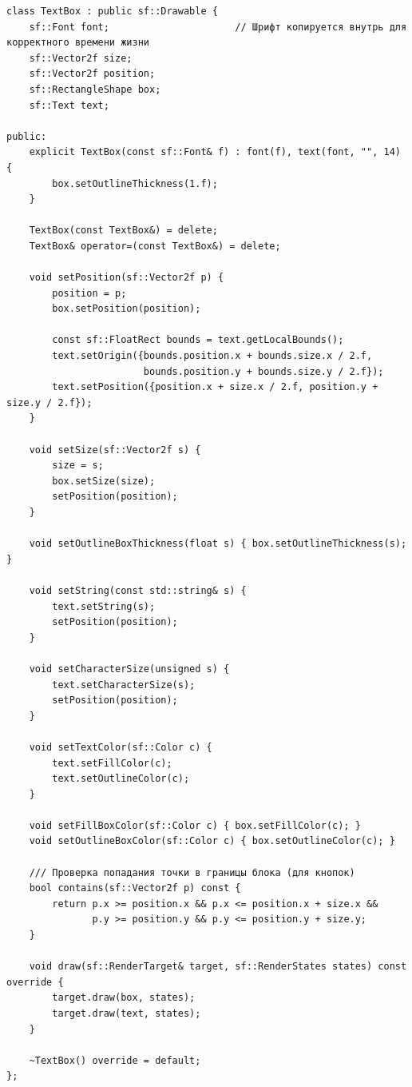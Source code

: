 \documentclass[a4paper]{article}
\begin{document}
\begin{lstlisting}[caption={Класс TextBox --- вспомогательный UI-виджет}, label={lst:textbox}]
class TextBox : public sf::Drawable {
    sf::Font font;                      // Шрифт копируется внутрь для корректного времени жизни
    sf::Vector2f size;
    sf::Vector2f position;
    sf::RectangleShape box;
    sf::Text text;

public:
    explicit TextBox(const sf::Font& f) : font(f), text(font, "", 14) {
        box.setOutlineThickness(1.f);
    }

    TextBox(const TextBox&) = delete;
    TextBox& operator=(const TextBox&) = delete;

    void setPosition(sf::Vector2f p) {
        position = p;
        box.setPosition(position);

        const sf::FloatRect bounds = text.getLocalBounds();
        text.setOrigin({bounds.position.x + bounds.size.x / 2.f,
                        bounds.position.y + bounds.size.y / 2.f});
        text.setPosition({position.x + size.x / 2.f, position.y + size.y / 2.f});
    }

    void setSize(sf::Vector2f s) {
        size = s;
        box.setSize(size);
        setPosition(position);
    }

    void setOutlineBoxThickness(float s) { box.setOutlineThickness(s); }

    void setString(const std::string& s) {
        text.setString(s);
        setPosition(position);
    }

    void setCharacterSize(unsigned s) {
        text.setCharacterSize(s);
        setPosition(position);
    }

    void setTextColor(sf::Color c) {
        text.setFillColor(c);
        text.setOutlineColor(c);
    }

    void setFillBoxColor(sf::Color c) { box.setFillColor(c); }
    void setOutlineBoxColor(sf::Color c) { box.setOutlineColor(c); }

    /// Проверка попадания точки в границы блока (для кнопок)
    bool contains(sf::Vector2f p) const {
        return p.x >= position.x && p.x <= position.x + size.x &&
               p.y >= position.y && p.y <= position.y + size.y;
    }

    void draw(sf::RenderTarget& target, sf::RenderStates states) const override {
        target.draw(box, states);
        target.draw(text, states);
    }

    ~TextBox() override = default;
};
\end{lstlisting}
\end{document}
